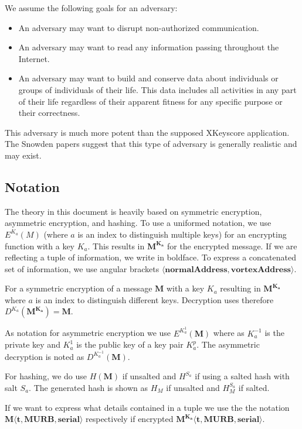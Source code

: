 \documentclass[10pt,journal,compsoc]{IEEEtran}
\begin{document}
We assume the following goals for an adversary:
\begin{itemize}
	\item An adversary may want to disrupt non-authorized communication.
	\item An adversary may want to read any information passing throughout the Internet.
	\item An adversary may want to build and conserve data about individuals or groups of individuals of their life. This data includes all activities in any part of their life regardless of their apparent fitness for any specific purpose or their correctness.
\end{itemize}

This adversary is much more potent than the supposed XKeyscore application. The Snowden papers suggest that this type of adversary is generally realistic and may exist.

\subsection{Notation \label{sec:encNot}}
The theory in this document is heavily based on symmetric encryption, asymmetric encryption, and hashing. To use a uniformed notation, we use $E^{K_a}(M)$ (where $a$ is an index to distinguish multiple keys) for an encrypting function with a key $K_a$. This results in $\mathbf{M^{K_a}}$ for the encrypted message. If we are reflecting a tuple of information, we write in boldface. To express a concatenated set of information, we use angular brackets $\mathbf{\langle normalAddress,vortexAddress\rangle }$. 

For a symmetric encryption of a message $\mathbf{M}$ with a key $K_a$ resulting in $\mathbf{M^{K_a}}$ where $a$ is an index to distinguish different keys. Decryption uses therefore $D^{K_a}(\mathbf{M^{K_a}})=\mathbf{M}$.

As notation for asymmetric encryption we use $E^{K^{1}_a}(\mathbf{M})$ where as $K^{-1}_a$ is the private key and $K^{1}_a$ is the public key of a key pair $K^p_a$. The asymmetric decryption is noted as $D^{K^{-1}_a}(\mathbf{M})$.

For hashing, we do use $H(\mathbf{M})$ if unsalted and $H^{S_a}$ if using a salted hash with salt $S_a$. The generated hash is shown as $H_M$ if unsalted and $H^{S_a}_M$ if salted.

If we want to express what details contained in a tuple we use the the notation $\mathbf{M\langle t,MURB,serial\rangle }$ respectively if encrypted $\mathbf{M^{K_{a}}\langle t,MURB,serial\rangle}$.
\end{document}
